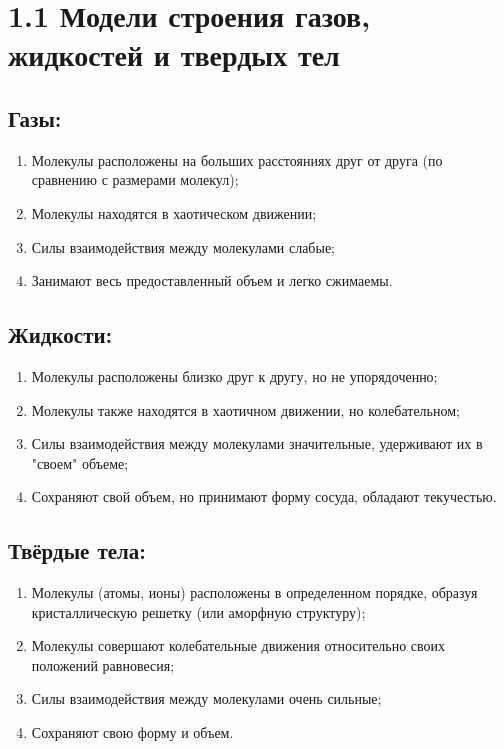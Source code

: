 \documentclass[a4paper,12pt]{article}
\begin{document}
\begin{center}
\end{center}

\vspace{-2.5em}

\section*{1.1 Модели строения газов, жидкостей и твердых тел}

\vspace{-9pt}
\subsection*{Газы:}
\vspace{-3pt}
\begin{enumerate}[itemsep=0pt, topsep=0pt, parsep=0pt]
  \item Молекулы расположены на больших расстояниях друг от друга (по сравнению с размерами молекул);
  \item Молекулы находятся в хаотическом движении;
  \item Силы взаимодействия между молекулами слабые;
  \item Занимают весь предоставленный объем и легко сжимаемы.
\end{enumerate}

\vspace{-9pt}
\subsection*{Жидкости:}
\vspace{-3pt}
\begin{enumerate}[itemsep=0pt, topsep=0pt, parsep=0pt]
  \item Молекулы расположены близко друг к другу, но не упорядоченно;
  \item Молекулы также находятся в хаотичном движении, но колебательном;
  \item Силы взаимодействия между молекулами значительные, удерживают их в "своем" объеме; 
  \item Сохраняют свой объем, но принимают форму сосуда, обладают текучестью.
\end{enumerate}

\vspace{-9pt}
\subsection*{Твёрдые тела:}
\vspace{-3pt}
\begin{enumerate} [itemsep=0pt, topsep=0pt, parsep=0pt]
  \item Молекулы (атомы, ионы) расположены в определенном порядке, образуя кристаллическую решетку (или аморфную структуру);
   \item Молекулы совершают колебательные движения относительно своих положений равновесия;
    \item Силы взаимодействия между молекулами очень сильные; 
  \item Сохраняют свою форму и объем.
\end{enumerate}
\end{document}
